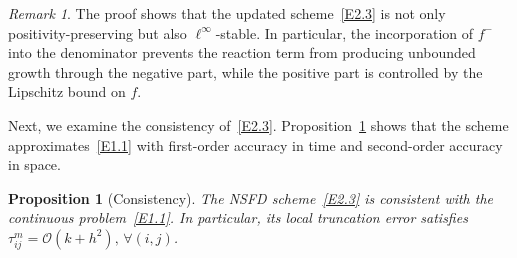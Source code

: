 \documentclass[final,12pt,3p]{elsarticle}
\theoremstyle{plain}
\newtheorem{proposition}[theorem]{Proposition}
\theoremstyle{definition}
\theoremstyle{remark}
\newtheorem{remark}{Remark}
\begin{document}
\begin{remark}\label{R3}
The proof shows that the updated scheme~\eqref{E2.3} is not only positivity-preserving but also $\ell^\infty$-stable.
In particular, the incorporation of $f^-$ into the denominator prevents the reaction term from producing unbounded growth through the negative part, while the positive part is controlled by the Lipschitz bound on $f$.
\end{remark}

Next, we examine the consistency of~\eqref{E2.3}. 
Proposition~\ref{P1} shows that the scheme approximates~\eqref{E1.1} with first-order accuracy in time and second-order accuracy in space.

\begin{proposition}[Consistency]\label{P1}
The NSFD scheme~\eqref{E2.3} is consistent with the continuous problem~\eqref{E1.1}. 
In particular, its local truncation error satisfies $\tau_{ij}^m = \mathcal{O}(k + h^2), \, \forall (i,j)$.
\end{proposition}
\end{document}
